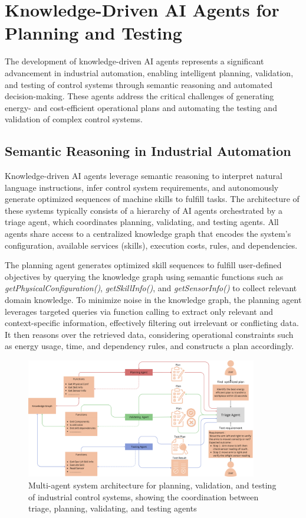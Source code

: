 \section{Knowledge-Driven AI Agents for Planning and Testing}

The development of knowledge-driven AI agents represents a significant advancement in industrial automation, enabling intelligent planning, validation, and testing of control systems through semantic reasoning and automated decision-making. These agents address the critical challenges of generating energy- and cost-efficient operational plans and automating the testing and validation of complex control systems.

\subsection{Semantic Reasoning in Industrial Automation}

Knowledge-driven AI agents leverage semantic reasoning to interpret natural language instructions, infer control system requirements, and autonomously generate optimized sequences of machine skills to fulfill tasks. The architecture of these systems typically consists of a hierarchy of AI agents orchestrated by a triage agent, which coordinates planning, validating, and testing agents. All agents share access to a centralized knowledge graph that encodes the system's configuration, available services (skills), execution costs, rules, and dependencies.

The planning agent generates optimized skill sequences to fulfill user-defined objectives by querying the knowledge graph using semantic functions such as \textit{getPhysicalConfiguration()}, \textit{getSkillInfo()}, and \textit{getSensorInfo()} to collect relevant domain knowledge. To minimize noise in the knowledge graph, the planning agent leverages targeted queries via function calling to extract only relevant and context-specific information, effectively filtering out irrelevant or conflicting data. It then reasons over the retrieved data, considering operational constraints such as energy usage, time, and dependency rules, and constructs a plan accordingly.

\begin{figure}[h]
    \centering
    \includegraphics[width=0.9\textwidth]{MX_Papers/Paper13/images/arch.png}
    \caption{Multi-agent system architecture for planning, validation, and testing of industrial control systems, showing the coordination between triage, planning, validating, and testing agents}
    \label{fig:ai_agent_architecture}
\end{figure}

